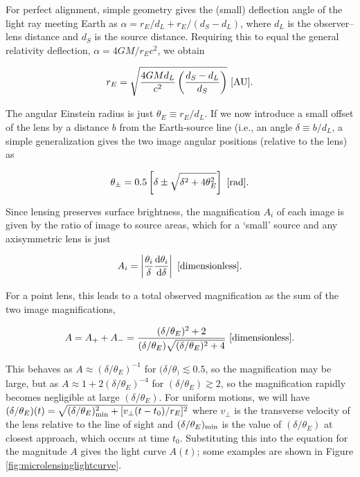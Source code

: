 \documentclass[a4paper,10pt]{article}
\begin{document}
{\noindent}For perfect alignment, simple geometry gives the (small) deflection angle of the light ray meeting Earth as $\alpha = r_E/d_L + r_E/(d_S-d_L)$, where $d_L$ is the observer–lens distance and $d_S$ is the source distance. Requiring this to equal the general relativity deflection, $\alpha=4GM/r_Ec^2$, we obtain

\begin{align*}
    r_E = \sqrt{\frac{4GMd_L}{c^2} \left(\frac{d_S-d_L}{d_S}\right)} ~ [{\rm AU}].
\end{align*}

{\noindent}The angular Einstein radius is just $\theta_E\equiv r_E/d_L$. If we now introduce a small offset of the lens by a distance $b$ from the Earth-source line (i.e., an angle $\delta\equiv b/d_L$, a simple generalization gives the two image angular positions (relative to the lens) as

\begin{align*}
    \theta_\pm = 0.5 \left[\delta\pm\sqrt{\delta^2+4\theta_E^2}\right] ~ [{\rm rad}].
\end{align*}

{\noindent}Since lensing preserves surface brightness, the magnification $A_i$ of each image is given by the ratio of image to source areas, which for a `small' source and any axisymmetric lens is just

\begin{align*}
    A_i = \left\lvert \frac{\theta_i}{\delta}\frac{{\rm d}\theta_i}{{\rm d}\delta} \right\rvert ~ [{\rm dimensionless}].
\end{align*}

{\noindent}For a point lens, this leads to a total observed magnification as the sum of the two image magnifications,

\begin{align*}
    A = A_+ + A_- = \frac{(\delta/\theta_E)^2+2}{(\delta/\theta_E)\sqrt{(\delta/\theta_E)^2+4}} ~ [{\rm dimensionless}].
\end{align*}

{\noindent}This behaves as $A\approx(\delta/\theta_E)^{-1}$ for $(\delta/\theta_)\lesssim0.5$, so the magnification may be large, but as $A\approx1+2(\delta/\theta_E)^{-4}$ for $(\delta/\theta_E)\gtrsim2$, so the magnification rapidly becomes negligible at large $(\delta/\theta_E)$. For uniform motions, we will have $(\delta/\theta_E)(t) = \sqrt{(\delta/\theta_E)_{\rm min}^2 + [v_\perp(t-t_0)/r_E]^2}$ where $v_\perp$ is the transverse velocity of the lens relative to the line of sight and $(\delta/\theta_E)_{\rm min}$ is the value of $(\delta/\theta_E)$ at closest approach, which occurs at time $t_0$. Substituting this into the equation for the magnitude $A$ gives the light curve $A(t)$; some examples are shown in Figure \ref{fig:microlensinglightcurve}.
\end{document}
